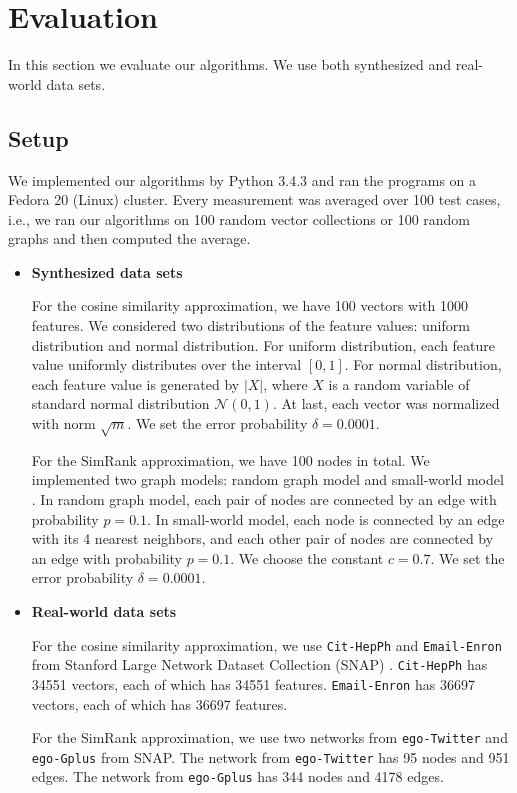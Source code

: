 \documentclass{article}
\begin{document}
\section{Evaluation}
\label{sec:eval}
In this section we evaluate our algorithms. We use both synthesized and real-world data sets.

\subsection{Setup}
We implemented our algorithms by Python 3.4.3 and ran the programs on a Fedora 20 (Linux) cluster. Every measurement was averaged over 100 test cases, i.e., we ran our algorithms on 100 random vector collections or 100 random graphs and then computed the average.

\begin{itemize}
\item \textbf{Synthesized data sets}

For the cosine similarity approximation, we have 100 vectors with 1000 features. We considered two distributions of the feature values: uniform distribution and normal distribution. For uniform distribution, each feature value uniformly distributes over the interval $[0,1]$. For normal distribution, each feature value is generated by $|X|$, where $X$ is a random variable of standard normal distribution $\mathcal{N}(0,1)$. At last, each vector was normalized with norm $\sqrt{m}$. We set the error probability $\delta = 0.0001$.

For the SimRank approximation, we have 100 nodes in total. We implemented two graph models: random graph model \cite{Gil59} and small-world model \cite{WS98}. In random graph model, each pair of nodes are connected by an edge with probability $p=0.1$. In small-world model, each node is connected by an edge with its 4 nearest neighbors, and each other pair of nodes are connected by an edge with probability $p=0.1$. We choose the constant $c=0.7$. We set the error probability $\delta = 0.0001$.

\item \textbf{Real-world data sets}

For the cosine similarity approximation, we use \texttt{Cit-HepPh} and \texttt{Email-Enron} from Stanford Large Network Dataset Collection (SNAP) \cite{LK15}. \texttt{Cit-HepPh} has 34551 vectors, each of which has 34551 features. \texttt{Email-Enron} has 36697 vectors, each of which has 36697 features.

For the SimRank approximation, we use two networks from \texttt{ego-Twitter} and \texttt{ego-Gplus} from SNAP. The network from \texttt{ego-Twitter} has 95 nodes and 951 edges. The network from \texttt{ego-Gplus} has 344 nodes and 4178 edges.
\end{itemize}
\end{document}
